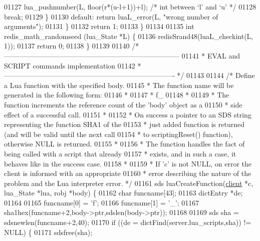 \begin{DoxyCode}
{{{{{{{{{01127       lua\_pushnumber(L, floor(r*(u-l+1))+l);  \textcolor{comment}{/* int between `l' and `u' */}
01128       \textcolor{keywordflow}{break};
01129     \}
01130     \textcolor{keywordflow}{default}: \textcolor{keywordflow}{return} luaL\_error(L, \textcolor{stringliteral}{"wrong number of arguments"});
01131   \}
01132   \textcolor{keywordflow}{return} 1;
01133 \}
01134 
01135 \textcolor{keywordtype}{int} redis\_math\_randomseed (lua\_State *L) \{
01136   redisSrand48(luaL\_checkint(L, 1));
01137   \textcolor{keywordflow}{return} 0;
01138 \}
01139 
01140 \textcolor{comment}{/* ---------------------------------------------------------------------------}
01141 \textcolor{comment}{ * EVAL and SCRIPT commands implementation}
01142 \textcolor{comment}{ * ------------------------------------------------------------------------- */}
01143 
01144 \textcolor{comment}{/* Define a Lua function with the specified body.}
01145 \textcolor{comment}{ * The function name will be generated in the following form:}
01146 \textcolor{comment}{ *}
01147 \textcolor{comment}{ *   f\_<hex sha1 sum>}
01148 \textcolor{comment}{ *}
01149 \textcolor{comment}{ * The function increments the reference count of the 'body' object as a}
01150 \textcolor{comment}{ * side effect of a successful call.}
01151 \textcolor{comment}{ *}
01152 \textcolor{comment}{ * On success a pointer to an SDS string representing the function SHA1 of the}
01153 \textcolor{comment}{ * just added function is returned (and will be valid until the next call}
01154 \textcolor{comment}{ * to scriptingReset() function), otherwise NULL is returned.}
01155 \textcolor{comment}{ *}
01156 \textcolor{comment}{ * The function handles the fact of being called with a script that already}
01157 \textcolor{comment}{ * exists, and in such a case, it behaves like in the success case.}
01158 \textcolor{comment}{ *}
01159 \textcolor{comment}{ * If 'c' is not NULL, on error the client is informed with an appropriate}
01160 \textcolor{comment}{ * error describing the nature of the problem and the Lua interpreter error. */}
01161 sds luaCreateFunction(\hyperlink{structclient}{client} *c, lua\_State *lua, robj *body) \{
01162     \textcolor{keywordtype}{char} funcname[43];
01163     dictEntry *de;
01164 
01165     funcname[0] = \textcolor{stringliteral}{'f'};
01166     funcname[1] = \textcolor{stringliteral}{'\_'};
01167     sha1hex(funcname+2,body->ptr,sdslen(body->ptr));
01168 
01169     sds sha = sdsnewlen(funcname+2,40);
01170     \textcolor{keywordflow}{if} ((de = dictFind(server.lua\_scripts,sha)) != NULL) \{
01171         sdsfree(sha);
}}}}}}}}}
\end{DoxyCode}
